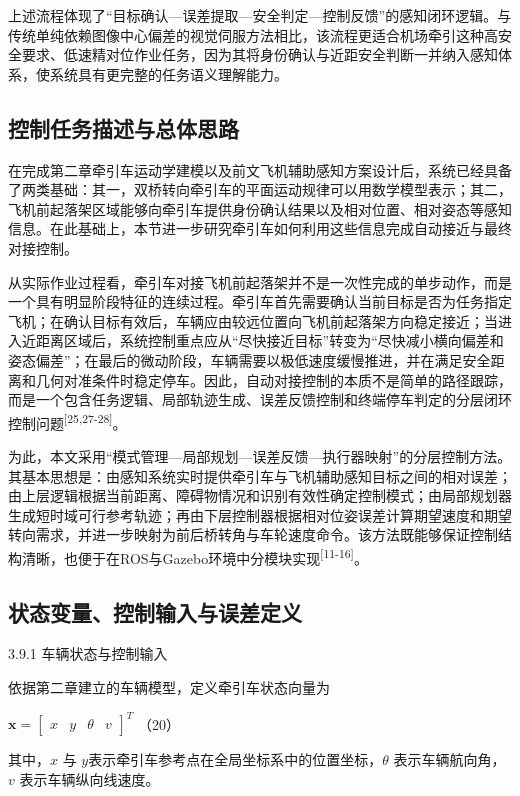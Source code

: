 上述流程体现了``目标确认---误差提取---安全判定---控制反馈''的感知闭环逻辑。与传统单纯依赖图像中心偏差的视觉伺服方法相比，该流程更适合机场牵引这种高安全要求、低速精对位作业任务，因为其将身份确认与近距安全判断一并纳入感知体系，使系统具有更完整的任务语义理解能力。

\subsection{控制任务描述与总体思路}

在完成第二章牵引车运动学建模以及前文飞机辅助感知方案设计后，系统已经具备了两类基础：其一，双桥转向牵引车的平面运动规律可以用数学模型表示；其二，飞机前起落架区域能够向牵引车提供身份确认结果以及相对位置、相对姿态等感知信息。在此基础上，本节进一步研究牵引车如何利用这些信息完成自动接近与最终对接控制。

从实际作业过程看，牵引车对接飞机前起落架并不是一次性完成的单步动作，而是一个具有明显阶段特征的连续过程。牵引车首先需要确认当前目标是否为任务指定飞机；在确认目标有效后，车辆应由较远位置向飞机前起落架方向稳定接近；当进入近距离区域后，系统控制重点应从``尽快接近目标''转变为``尽快减小横向偏差和姿态偏差''；在最后的微动阶段，车辆需要以极低速度缓慢推进，并在满足安全距离和几何对准条件时稳定停车。因此，自动对接控制的本质不是简单的路径跟踪，而是一个包含任务逻辑、局部轨迹生成、误差反馈控制和终端停车判定的分层闭环控制问题\textsuperscript{[25,27-28]}。

为此，本文采用``模式管理---局部规划---误差反馈---执行器映射''的分层控制方法。其基本思想是：由感知系统实时提供牵引车与飞机辅助感知目标之间的相对误差；由上层逻辑根据当前距离、障碍物情况和识别有效性确定控制模式；由局部规划器生成短时域可行参考轨迹；再由下层控制器根据相对位姿误差计算期望速度和期望转向需求，并进一步映射为前后桥转角与车轮速度命令。该方法既能够保证控制结构清晰，也便于在ROS与Gazebo环境中分模块实现\textsuperscript{[11-16]}。

\subsection{状态变量、控制输入与误差定义}

3.9.1 车辆状态与控制输入

依据第二章建立的车辆模型，定义牵引车状态向量为

\(\mathbf{x} = \begin{bmatrix}
x & y & \theta & v
\end{bmatrix}^{T}\) （20）

其中，\(x\) 与 \(y\)表示牵引车参考点在全局坐标系中的位置坐标，\(\theta\)
表示车辆航向角，\(v\) 表示车辆纵向线速度。

